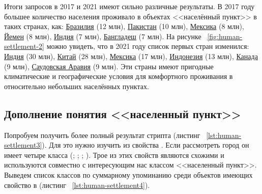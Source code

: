 Итоги запросов в 2017 и 2021 имеют сильно различные результаты. В 2017 году большее количество населения проживало в объектах <<населённый пункт>> в таких странах, как: \href{http://www.wikidata.org/entity/Q155}{Бразилия} (\num{12} млн), \href{http://www.wikidata.org/entity/Q843}{Пакистан} (\num{10} млн), \href{http://www.wikidata.org/entity/Q96}{Мексика} (\num{8} млн), \href{http://www.wikidata.org/entity/Q805}{Йемен} (\num{8} млн), \href{http://www.wikidata.org/entity/Q668}{Индия} (\num{7} млн), \href{http://www.wikidata.org/entity/Q902}{Бангладеш} (\num{7} млн). На рисунке ~\ref{fig:human-settlement-2} можно увидеть, что в 2021 году список первых стран изменился: \href{http://www.wikidata.org/entity/Q668}{Индия} (\num{30} млн), \href{http://www.wikidata.org/entity/Q148}{Китай} (\num{28} млн), \href{http://www.wikidata.org/entity/Q96}{Мексика} (\num{17} млн), \href{http://www.wikidata.org/entity/Q252}{Индонезия} (\num{13} млн), \href{http://www.wikidata.org/entity/Q16}{Канада} (\num{9} млн), \href{http://www.wikidata.org/entity/Q851}{Саудовская Аравия} (\num{9} млн). 
Эти страны имеют пригодные климатические и географические условия для комфортного проживания в относительно небольших населённых пунктах.

\subsection{Дополнение понятия <<населенный пункт>>}

Попробуем получить более полный результат стрипта (листинг ~\protect\ref{lst:human-settlement3}). Для это нужно изучить  из свойства . Если рассмотреть город  он имеет четыре класса (; ; ; ). Трое из этих свойств являются схожими и используются совместно с интересующим нас классом <<населенный пункт>>. Выведем список классов по суммарному упоминанию среди объектов имеющих свойство  в  (листинг ~\protect\ref{lst:human-settlement4}).

